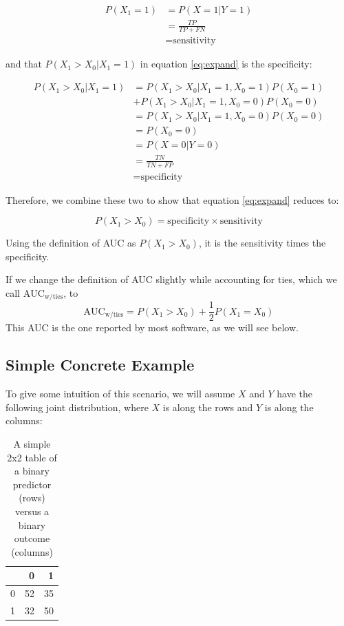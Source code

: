 \documentclass[article]{jss}
\begin{document}
\begin{align*}
P(X_{1} = 1) &= P(X = 1 | Y = 1)\\
&= \frac{TP}{TP + FN} \\
&= \text{sensitivity}
\end{align*}

and that \(P(X_{1} > X_{0} | X_{1} = 1)\) in equation \eqref{eq:expand}
is the specificity:

\begin{align*}
P(X_{1} > X_{0} | X_{1} = 1) &= P(X_{1} > X_{0} | X_{1} = 1, X_{0} =1) P(X_{0} = 1) \\
&+ P(X_{1} > X_{0} | X_{1} = 1, X_{0} =0) P(X_{0} = 0) \\
&= P(X_{1} > X_{0} | X_{1} = 1, X_{0} =0) P(X_{0} = 0) \\
&= P(X_{0} = 0) \\
&= P(X = 0 | Y = 0)\\
&= \frac{TN}{TN + FP} \\
&= \text{specificity}
\end{align*}

Therefore, we combine these two to show that equation \eqref{eq:expand}
reduces to:

\[
P(X_{1} > X_{0}) = \text{specificity} \times \text{sensitivity}
\]

Using the definition of AUC as \(P(X_{1} > X_{0})\), it is the
sensitivity times the specificity.

If we change the definition of AUC slightly while accounting for ties,
which we call \(\text{AUC}_{\text{w/ties}}\), to \[
\text{AUC}_{\text{w/ties}} = P(X_{1} > X_{0}) + \frac{1}{2} P(X_{1} = X_{0})
\] This AUC is the one reported by most software, as we will see below.

\hypertarget{simple-concrete-example}{%
\subsection{Simple Concrete Example}\label{simple-concrete-example}}

To give some intuition of this scenario, we will assume \(X\) and \(Y\)
have the following joint distribution, where \(X\) is along the rows and
\(Y\) is along the columns:

\begin{table}

\caption{\label{tab:create_tab}A simple 2x2 table of a binary predictor (rows) versus a binary outcome (columns)}
\centering
\begin{tabular}[t]{l|r|r}
\hline
  & 0 & 1\\
\hline
0 & 52 & 35\\
\hline
1 & 32 & 50\\
\hline
\end{tabular}
\end{table}
\end{document}
